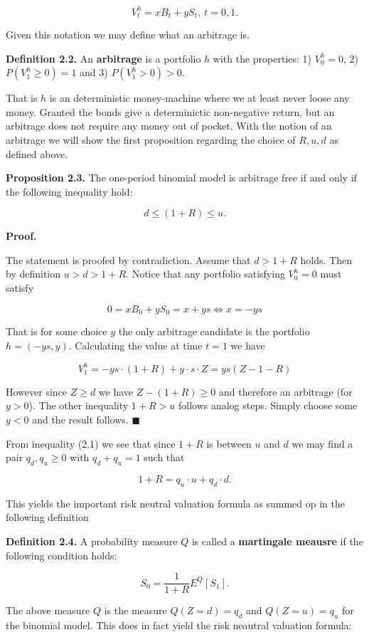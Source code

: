 \documentclass[
]{article}
\begin{document}
\[V^h_t=xB_t+yS_t,\ t=0,1.\]

Given this notation we may define what an arbitrage is.

\textbf{Definition 2.2.} An \textbf{arbitrage} is a portfolio \(h\) with
the properties: 1) \(V^h_0=0\), 2) \(P(V^h_1\ge 0)=1\) and 3)
\(P(V^h_1>0)>0\).

That is \(h\) is an deterministic money-machine where we at least never
loose any money. Granted the bonds give a determinictic non-negative
return, but an arbitrage does not require any money out of pocket. With
the notion of an arbitrage we will show the first proposition regarding
the choice of \(R,u,d\) as defined above.

\textbf{Proposition 2.3.} The one-period binomial model is arbitrage
free if and only if the following inequality hold:

\[d\le (1+R)\le u.\tag{2.1}\]

\textbf{Proof.}

The statement is proofed by contradiction. Assume that \(d>1+R\) holds.
Then by definition \(u>d>1+R\). Notice that any portfolio satisfying
\(V_0^h=0\) must satisfy

\[0=xB_0+yS_0=x+ys\iff x=-ys\]

That is for some choice \(y\) the only arbitrage candidate is the
portfolio \(h=(-ys,y)\). Calculating the value at time \(t=1\) we have

\[V_1^h=-ys\cdot(1+R)+y\cdot s\cdot Z=ys(Z-1-R)\]

However since \(Z\ge d\) we have \(Z-(1+R)\ge 0\) and therefore an
arbitrage (for \(y>0\)). The other inequality \(1+R>u\) follows analog
steps. Simply choose some \(y<0\) and the result follows.
\(\blacksquare\)

From inequality (2.1) we see that since \(1+R\) is between \(u\) and
\(d\) we may find a pair \(q_d,q_u\ge 0\) with \(q_d+q_u=1\) such that

\[1+R=q_u\cdot u+q_d\cdot d.\]

This yields the important risk neutral valuation formula as summed op in
the following definition

\textbf{Definition 2.4.} A probability measure \(Q\) is called a
\textbf{martingale meausre} if the following condition holds:

\[S_0=\frac{1}{1+R}E^Q[S_1].\]

The above measure \(Q\) is the measure \(Q(Z=d)=q_d\) and \(Q(Z=u)=q_u\)
for the binomial model. This does in fact yield the risk neautral
valuation formula:
\end{document}
